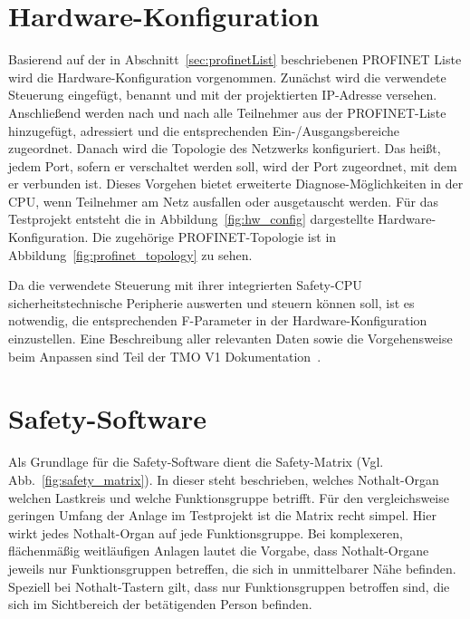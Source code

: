 \section{Hardware-Konfiguration}
\label{sec:hw_config}
Basierend auf der in Abschnitt~\ref{sec:profinetList} beschriebenen PROFINET Liste wird die Hardware-Konfiguration vorgenommen. Zunächst wird die verwendete Steuerung eingefügt, benannt und mit der projektierten IP-Adresse versehen. Anschließend werden nach und nach alle Teilnehmer aus der PROFINET-Liste hinzugefügt, adressiert und die entsprechenden Ein-/Ausgangsbereiche zugeordnet. Danach wird die Topologie des Netzwerks konfiguriert. Das heißt, jedem Port, sofern er verschaltet werden soll, wird der Port zugeordnet, mit dem er verbunden ist. Dieses Vorgehen bietet erweiterte Diagnose-Möglichkeiten in der CPU, wenn Teilnehmer am Netz ausfallen oder ausgetauscht werden. Für das Testprojekt entsteht die in Abbildung~\ref{fig:hw_config} dargestellte Hardware-Konfiguration. Die zugehörige PROFINET-Topologie ist in Abbildung~\ref{fig:profinet_topology} zu sehen.\par
Da die verwendete Steuerung mit ihrer integrierten Safety-CPU sicherheitstechnische Peripherie auswerten und steuern können soll, ist es notwendig, die entsprechenden F-Parameter in der Hardware-Konfiguration einzustellen. Eine Beschreibung aller relevanten Daten sowie die Vorgehensweise beim Anpassen sind Teil der TMO V1 Dokumentation~.





\section{Safety-Software}
\label{sec:safety_software}

Als Grundlage für die Safety-Software dient die Safety-Matrix (Vgl. Abb.~\ref{fig:safety_matrix}). In dieser steht beschrieben, welches Nothalt-Organ welchen Lastkreis und welche Funktionsgruppe betrifft. Für den vergleichsweise geringen Umfang der Anlage im Testprojekt ist die Matrix recht simpel. Hier wirkt jedes Nothalt-Organ auf jede Funktionsgruppe. Bei komplexeren, flächenmäßig weitläufigen Anlagen lautet die Vorgabe, dass Nothalt-Organe jeweils nur Funktionsgruppen betreffen, die sich in unmittelbarer Nähe befinden. Speziell bei Nothalt-Tastern gilt, dass nur Funktionsgruppen betroffen sind, die sich im Sichtbereich der betätigenden Person befinden.


